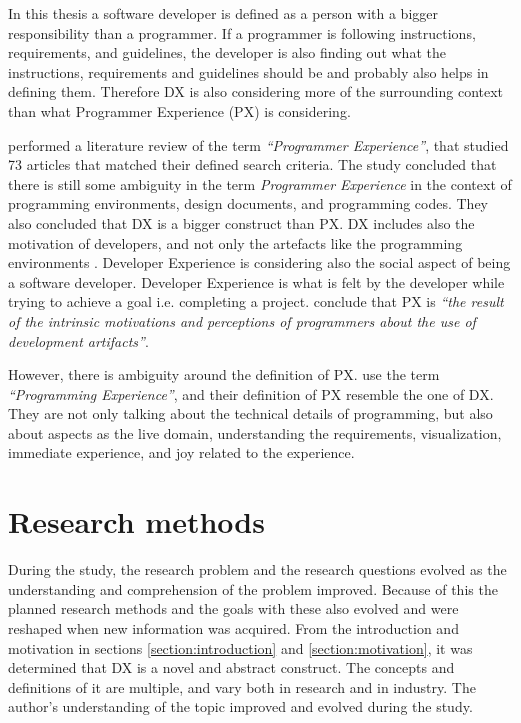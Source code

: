 \documentclass[english, 12pt, a4paper, sci, utf8, a-1b, online]{aaltothesis}
\begin{document}
In this thesis a software developer is defined as a person with a bigger responsibility than a programmer. If a programmer is following instructions, requirements, and guidelines, the developer is also finding out what the instructions, requirements and guidelines should be and probably also helps in defining them. Therefore DX is also considering more of the surrounding context than what Programmer Experience (PX) is considering.

\textcite{programmer-experience} performed a literature review of the term \textit{``Programmer Experience''}, that studied 73 articles that matched their defined search criteria. The study concluded that there is still some ambiguity in the term \textit{Programmer Experience} in the context of programming environments, design documents, and programming codes. They also concluded that DX is a bigger construct than PX. DX includes also the motivation of developers, and not only the artefacts like the programming environments \parencite{programmer-experience}. Developer Experience is considering also the social aspect of being a software developer. Developer Experience is what is felt by the developer while trying to achieve a goal i.e. completing a project. \textcite{programmer-experience} conclude that PX is \textit{``the result of the intrinsic motivations and perceptions of programmers about the use of development artifacts''}.

However, there is ambiguity around the definition of PX. \textcite{programming-experience} use the term \textit{``Programming Experience''}, and their definition of PX resemble the one of DX. They are not only talking about the technical details of programming, but also about aspects as the live domain, understanding the requirements, visualization, immediate experience, and joy related to the experience.  



\clearpage
\section{Research methods} \label{section:research-methods}

During the study, the research problem and the research questions evolved as the understanding and comprehension of the problem improved. Because of this the planned research methods and the goals with these also evolved and were reshaped when new information was acquired. From the introduction and motivation in sections \ref{section:introduction} and \ref{section:motivation}, it was determined that DX is a novel and abstract construct. The concepts and definitions of it are multiple, and vary both in research and in industry. The author's understanding of the topic improved and evolved during the study.
\end{document}
